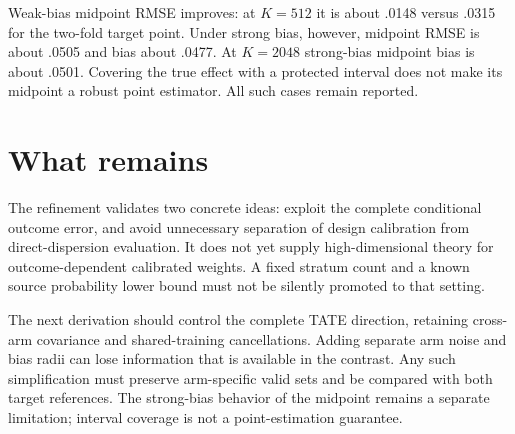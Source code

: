 \documentclass[11pt]{article}
\begin{document}
Weak-bias midpoint RMSE improves: at $K=512$ it is about .0148 versus .0315
for the two-fold target point. Under strong bias, however, midpoint RMSE is
about .0505 and bias about .0477. At $K=2048$ strong-bias midpoint bias is
about .0501. Covering the true effect with a protected interval does not
make its midpoint a robust point estimator. All such cases remain reported.

\section{What remains}

The refinement validates two concrete ideas: exploit the complete conditional
outcome error, and avoid unnecessary separation of design calibration from
direct-dispersion evaluation. It does not yet supply high-dimensional theory
for outcome-dependent calibrated weights. A fixed stratum count and a known
source probability lower bound must not be silently promoted to that setting.

The next derivation should control the complete TATE direction, retaining
cross-arm covariance and shared-training cancellations. Adding separate arm
noise and bias radii can lose information that is available in the contrast.
Any such simplification must preserve arm-specific valid sets and be compared
with both target references. The strong-bias behavior of the midpoint remains
a separate limitation; interval coverage is not a point-estimation guarantee.
\end{document}
